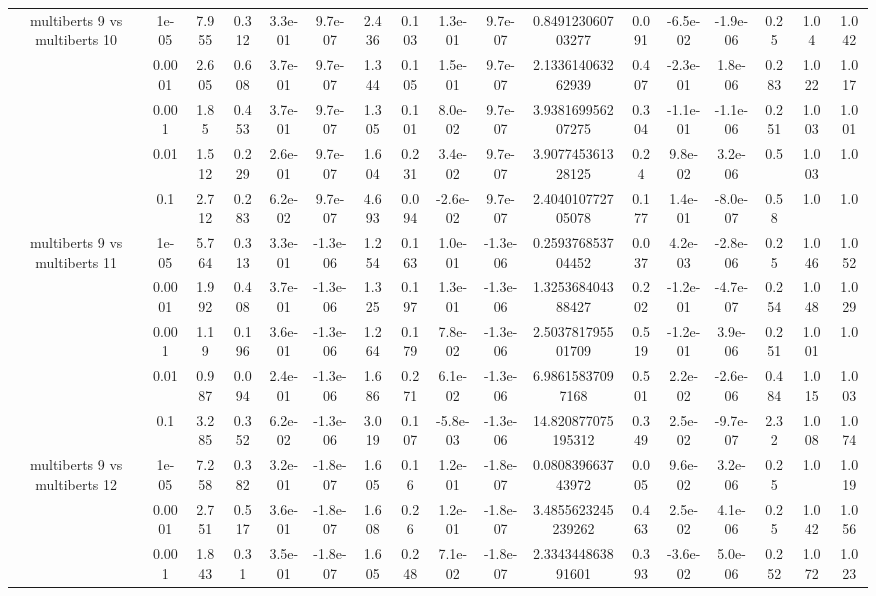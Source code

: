 \begin{tabular}{|c|c|c|c|c|c|c|c|c|c|c|c|c|c|c|c|c|}
\hline
\multirow{5}{*}{multiberts 9 vs multiberts 10} & 1e-05 & 7.955 & 0.312 & 3.3e-01 & 9.7e-07 & 2.436 & 0.103 & 1.3e-01 & 9.7e-07 & 0.849123060703277 & 0.091 & -6.5e-02 & -1.9e-06 & 0.25 & 1.04 & 1.042 \\
 & 0.0001 & 2.605 & 0.608 & 3.7e-01 & 9.7e-07 & 1.344 & 0.105 & 1.5e-01 & 9.7e-07 & 2.133614063262939 & 0.407 & -2.3e-01 & 1.8e-06 & 0.283 & 1.022 & 1.017 \\
 & 0.001 & 1.85 & 0.453 & 3.7e-01 & 9.7e-07 & 1.305 & 0.101 & 8.0e-02 & 9.7e-07 & 3.938169956207275 & 0.304 & -1.1e-01 & -1.1e-06 & 0.251 & 1.003 & 1.001 \\
 & 0.01 & 1.512 & 0.229 & 2.6e-01 & 9.7e-07 & 1.604 & 0.231 & 3.4e-02 & 9.7e-07 & 3.907745361328125 & 0.24 & 9.8e-02 & 3.2e-06 & 0.5 & 1.003 & 1.0 \\
 & 0.1 & 2.712 & 0.283 & 6.2e-02 & 9.7e-07 & 4.693 & 0.094 & -2.6e-02 & 9.7e-07 & 2.404010772705078 & 0.177 & 1.4e-01 & -8.0e-07 & 0.58 & 1.0 & 1.0 \\
\hline
\multirow{5}{*}{multiberts 9 vs multiberts 11} & 1e-05 & 5.764 & 0.313 & 3.3e-01 & -1.3e-06 & 1.254 & 0.163 & 1.0e-01 & -1.3e-06 & 0.259376853704452 & 0.037 & 4.2e-03 & -2.8e-06 & 0.25 & 1.046 & 1.052 \\
 & 0.0001 & 1.992 & 0.408 & 3.7e-01 & -1.3e-06 & 1.325 & 0.197 & 1.3e-01 & -1.3e-06 & 1.325368404388427 & 0.202 & -1.2e-01 & -4.7e-07 & 0.254 & 1.048 & 1.029 \\
 & 0.001 & 1.19 & 0.196 & 3.6e-01 & -1.3e-06 & 1.264 & 0.179 & 7.8e-02 & -1.3e-06 & 2.503781795501709 & 0.519 & -1.2e-01 & 3.9e-06 & 0.251 & 1.001 & 1.0 \\
 & 0.01 & 0.987 & 0.094 & 2.4e-01 & -1.3e-06 & 1.686 & 0.271 & 6.1e-02 & -1.3e-06 & 6.98615837097168 & 0.501 & 2.2e-02 & -2.6e-06 & 0.484 & 1.015 & 1.003 \\
 & 0.1 & 3.285 & 0.352 & 6.2e-02 & -1.3e-06 & 3.019 & 0.107 & -5.8e-03 & -1.3e-06 & 14.820877075195312 & 0.349 & 2.5e-02 & -9.7e-07 & 2.32 & 1.008 & 1.074 \\
\hline
\multirow{5}{*}{multiberts 9 vs multiberts 12} & 1e-05 & 7.258 & 0.382 & 3.2e-01 & -1.8e-07 & 1.605 & 0.16 & 1.2e-01 & -1.8e-07 & 0.080839663743972 & 0.005 & 9.6e-02 & 3.2e-06 & 0.25 & 1.0 & 1.019 \\
 & 0.0001 & 2.751 & 0.517 & 3.6e-01 & -1.8e-07 & 1.608 & 0.26 & 1.2e-01 & -1.8e-07 & 3.4855623245239262 & 0.463 & 2.5e-02 & 4.1e-06 & 0.25 & 1.042 & 1.056 \\
 & 0.001 & 1.843 & 0.31 & 3.5e-01 & -1.8e-07 & 1.605 & 0.248 & 7.1e-02 & -1.8e-07 & 2.334344863891601 & 0.393 & -3.6e-02 & 5.0e-06 & 0.252 & 1.072 & 1.023 \\

\end{tabular}
